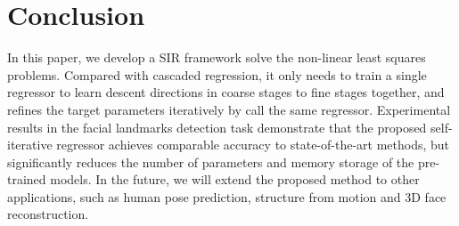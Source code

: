 \documentclass[letterpaper]{article} \usepackage{aaai18}  \usepackage{times}  \usepackage{helvet}  \usepackage{courier}  \usepackage{url}  \usepackage{graphicx}
\begin{document}
\section{Conclusion}
In this paper, we develop a SIR framework solve the non-linear least squares problems. Compared with cascaded regression, it only needs to train a single regressor to learn descent directions in coarse stages to fine stages together, and refines the target parameters iteratively by call the same regressor. Experimental results in the facial landmarks detection task demonstrate that the proposed self-iterative regressor achieves comparable accuracy to state-of-the-art methods, but significantly reduces the number of parameters and memory storage of the pre-trained models. In the future, we will extend the proposed method to other applications, such as human pose prediction, structure from motion and 3D face reconstruction.


{\small


}
\end{document}
